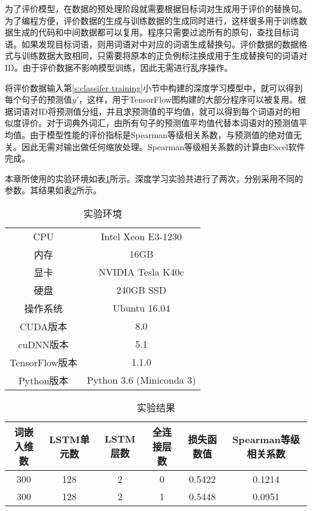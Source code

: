 为了评价模型，在数据的预处理阶段就需要根据目标词对生成用于评价的替换句。为了编程方便，评价数据的生成与训练数据的生成同时进行，这样很多用于训练数据生成的代码和中间数据都可以复用。程序只需要过滤所有的原句，查找目标词语。如果发现目标词语，则用词语对中对应的词语生成替换句。评价数据的数据格式与训练数据大致相同，只需要将原本的正负例标注换成用于生成替换句的词语对ID。由于评价数据不影响模型训练，因此无需进行乱序操作。

将评价数据输入第\ref{s:classifer training}小节中构建的深度学习模型中，就可以得到每个句子的预测值$y'$，这样，用于TensorFlow图构建的大部分程序可以被复用。根据词语对ID将预测值分组，并且求预测值的平均值，就可以得到每个词语对的相似度评价。对于词典外词汇，由所有句子的预测值平均值代替本词语对的预测值平均值。由于模型性能的评价指标是Spearman等级相关系数，与预测值的绝对值无关。因此无需对输出做任何缩放处理。Spearman等级相关系数的计算由Excel软件完成。

本章所使用的实验环境如表\ref{t:environment}所示。深度学习实验共进行了两次，分别采用不同的参数。其结果如表\ref{t:classifer result}所示。
\begin{table}[h]
	\caption{实验环境}
	\label{t:environment}
	\vspace{0.5em}\centering\wuhao
	\begin{tabular}{cc}
		\toprule[1.5pt]
		CPU & Intel Xeon E3-1230 \\
		内存 & 16GB \\
		显卡 & NVIDIA Tesla K40c \\
		硬盘 & 240GB SSD \\
		操作系统 & Ubuntu 16.04 \\
		CUDA版本 & 8.0 \\
		cuDNN版本 & 5.1 \\
		TensorFlow版本 & 1.1.0 \\
		Python版本 & Python 3.6 (Miniconda 3) \\
		\bottomrule[1.5pt]
	\end{tabular}
\end{table}

\begin{table}[h]
	\caption{实验结果}
	\label{t:classifer result}
	\vspace{0.5em}\centering\wuhao
	\begin{tabular}{cccccc}
		\toprule[1.5pt]
		词嵌入维数 & LSTM单元数 & LSTM层数 & 全连接层数 & 损失函数值 & Spearman等级相关系数 \\
		\midrule[1pt]
		300 & 128 & 2 & 0 & 0.5422 & 0.1214 \\
		300 & 128 & 2 & 1 & 0.5448 & 0.0951 \\
		\bottomrule[1.5pt]
	\end{tabular}
\end{table}